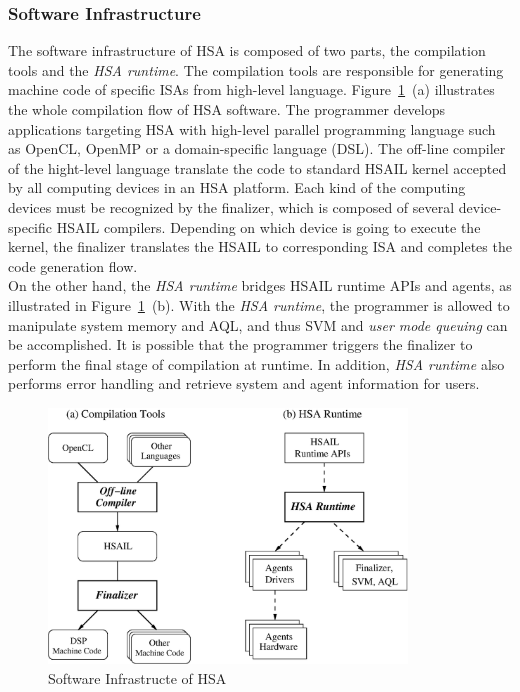         \subsubsection{Software Infrastructure}
        The software infrastructure of HSA is composed of two parts, the compilation tools and the \textit{HSA runtime}.   
        The compilation tools are responsible for generating machine code of specific ISAs from high-level language.
        Figure~\ref{fig:swinf}~(a) illustrates the whole compilation flow of HSA software.
        The programmer develops applications targeting HSA with high-level parallel programming language such as OpenCL, OpenMP or a domain-specific language (DSL).
        The off-line compiler of the hight-level language translate the code to standard HSAIL kernel accepted by all computing devices in an HSA platform.
        Each kind of the computing devices must be recognized by the finalizer, 
        which is composed of several device-specific HSAIL compilers.
        Depending on which device is going to execute the kernel, 
        the finalizer translates the HSAIL to corresponding ISA and completes the code generation flow.
        \\\indent
        On the other hand, the \textit{HSA runtime} bridges HSAIL runtime APIs and agents, as illustrated in Figure~\ref{fig:swinf}~(b).
        With the \textit{HSA runtime}, the programmer is allowed to manipulate system memory and AQL, 
        and thus SVM and \textit{user mode queuing} can be accomplished.
        It is possible that the programmer triggers the finalizer to perform the final stage of compilation at runtime.
        In addition, \textit{HSA runtime} also performs error handling and retrieve system and agent information for users.
        \vspace{\textfig}
        \begin{figure}[!ht] 
            \centering
            \includegraphics[width=0.85\textwidth]{./figs/swinf.eps}
            \caption{Software Infrastructe of HSA}
            \label{fig:swinf}
        \end{figure}

